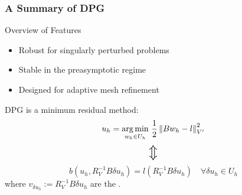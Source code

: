 \documentclass{beamer}
\newcommand{\pecosbold}[1]{{\color{pecos2}{#1}}}
\begin{document}
\begin{frame}
\frametitle{A Summary of DPG}
Overview of Features
\begin{itemize}
\item Robust for singularly perturbed problems
\item Stable in the preasymptotic regime
\item Designed for adaptive mesh refinement
\end{itemize}
\bigskip

DPG is a minimum residual method:
\[
u_{h} = \underset{w_{h} \in U_{h}} {\operatorname*{arg\,min}} \,\, \frac{1}{2}
\left\| Bw_{h}-l \right\|_{V'}^{2}
\]
\vspace{-1em}
\[
\scalebox{1.8}{\ensuremath{\Updownarrow}}
\]
\vspace{-1em}
\[
b(u_h,R_V^{-1}B\delta u_h)
=l(R_V^{-1}B\delta u_h)
\quad\forall\delta u_h\in U_h
\]
where $v_{\delta u_h}:=R_V^{-1}B\delta u_h$ are the
\pecosbold{optimal test functions}.
\end{frame}

\end{document}
